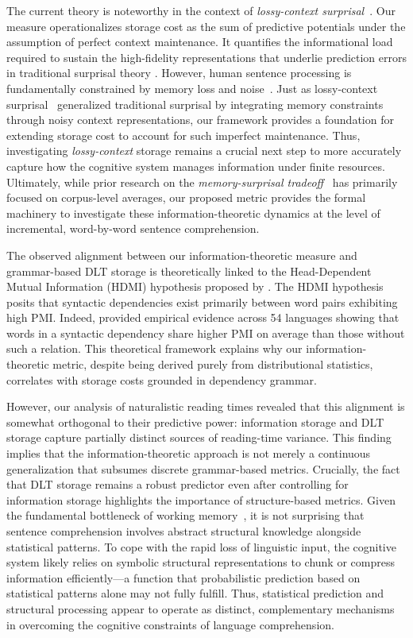 \documentclass[11pt]{article}
\begin{document}
The current theory is noteworthy in the context of \emph{lossy-context surprisal}~\citep{futrell-etal-2020-lossy}.
Our measure operationalizes storage cost as the sum of predictive potentials under the assumption of perfect context maintenance.
It quantifies the informational load required to sustain the high-fidelity representations that underlie prediction errors in traditional surprisal theory \citep{hale-2001,levy-2008}.
However, human sentence processing is fundamentally constrained by memory loss and noise~\citep{lewis-vasishth-2005,levy-etal-2009}.
Just as lossy-context surprisal~\citep{futrell-etal-2020-lossy} generalized traditional surprisal by integrating memory constraints through noisy context representations, our framework provides a foundation for extending storage cost to account for such imperfect maintenance.
Thus, investigating \emph{lossy-context} storage remains a crucial next step to more accurately capture how the cognitive system manages information under finite resources.
Ultimately, while prior research on the \emph{memory-surprisal tradeoff}~\citep{hahn-etal-2021,hahn-etal-2022-morpheme} has primarily focused on corpus-level averages, our proposed metric provides the formal machinery to investigate these information-theoretic dynamics at the level of incremental, word-by-word sentence comprehension.

The observed alignment between our information-theoretic measure and grammar-based DLT storage is theoretically linked to the Head-Dependent Mutual Information (HDMI) hypothesis proposed by \citet{futrell-etal-2019}.
The HDMI hypothesis posits that syntactic dependencies exist primarily between word pairs exhibiting high PMI.
Indeed, \citet{futrell-etal-2020-lossy} provided empirical evidence across 54 languages showing that words in a syntactic dependency share higher PMI on average than those without such a relation.
This theoretical framework explains why our information-theoretic metric, despite being derived purely from distributional statistics, correlates with storage costs grounded in dependency grammar.


However, our analysis of naturalistic reading times revealed that this alignment is somewhat orthogonal to their predictive power: information storage and DLT storage capture partially distinct sources of reading-time variance.
This finding implies that the information-theoretic approach is not merely a continuous generalization that subsumes discrete grammar-based metrics.
Crucially, the fact that DLT storage remains a robust predictor even after controlling for information storage highlights the importance of structure-based metrics.
Given the fundamental bottleneck of working memory~\citep{christiansen-chater-2016}, it is not surprising that sentence comprehension involves abstract structural knowledge alongside statistical patterns.
To cope with the rapid loss of linguistic input, the cognitive system likely relies on symbolic structural representations to chunk or compress information efficiently---a function that probabilistic prediction based on statistical patterns alone may not fully fulfill.
Thus, statistical prediction and structural processing appear to operate as distinct, complementary mechanisms in overcoming the cognitive constraints of language comprehension.
\end{document}
